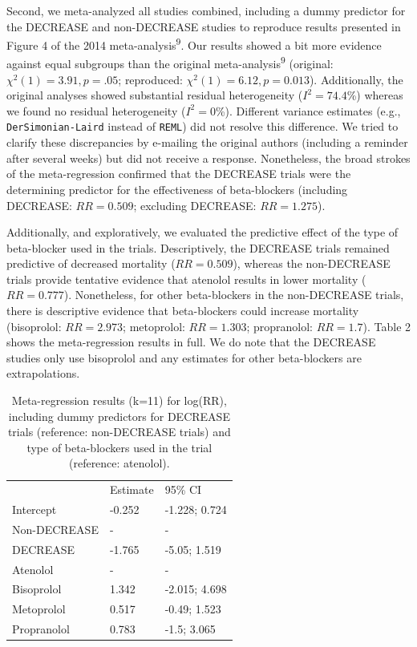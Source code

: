 \documentclass[]{article}
\begin{document}
Second, we meta-analyzed all studies combined, including a dummy
predictor for the DECREASE and non-DECREASE studies to reproduce results
presented in Figure 4 of the 2014 meta-analysis\textsuperscript{9}. Our
results showed a bit more evidence against equal subgroups than the
original meta-analysis\textsuperscript{9} (original:
\(\chi^2(1)=3.91,p=.05\); reproduced: \(\chi^2(1)=6.12,p=0.013\)).
Additionally, the original analyses showed substantial residual
heterogeneity (\(I^2=74.4\)\%) whereas we found no residual
heterogeneity (\(I^2=0\)\%). Different variance estimates (e.g.,
\texttt{DerSimonian-Laird} instead of \texttt{REML}) did not resolve
this difference. We tried to clarify these discrepancies by e-mailing
the original authors (including a reminder after several weeks) but did
not receive a response. Nonetheless, the broad strokes of the
meta-regression confirmed that the DECREASE trials were the determining
predictor for the effectiveness of beta-blockers (including DECREASE:
\(RR=0.509\); excluding DECREASE: \(RR=1.275\)).

Additionally, and exploratively, we evaluated the predictive effect of
the type of beta-blocker used in the trials. Descriptively, the DECREASE
trials remained predictive of decreased mortality (\(RR=0.509\)),
whereas the non-DECREASE trials provide tentative evidence that atenolol
results in lower mortality (\(RR=0.777\)). Nonetheless, for other
beta-blockers in the non-DECREASE trials, there is descriptive evidence
that beta-blockers could increase mortality (bisoprolol: \(RR=2.973\);
metoprolol: \(RR=1.303\); propranolol: \(RR=1.7\)). Table 2 shows the
meta-regression results in full. We do note that the DECREASE studies
only use bisoprolol and any estimates for other beta-blockers are
extrapolations.

\begin{longtable}[]{@{}lll@{}}
\caption{Meta-regression results (k=11) for log(RR), including dummy
predictors for DECREASE trials (reference: non-DECREASE trials) and type
of beta-blockers used in the trial (reference:
atenolol).}\tabularnewline
\toprule
\begin{minipage}[t]{0.32\columnwidth}\raggedright\strut
\strut
\end{minipage} & \begin{minipage}[t]{0.32\columnwidth}\raggedright\strut
Estimate\strut
\end{minipage} & \begin{minipage}[t]{0.32\columnwidth}\raggedright\strut
95\% CI\strut
\end{minipage}\tabularnewline
Intercept & -0.252 & -1.228; 0.724\tabularnewline
Non-DECREASE & - & -\tabularnewline
DECREASE & -1.765 & -5.05; 1.519\tabularnewline
Atenolol & - & -\tabularnewline
Bisoprolol & 1.342 & -2.015; 4.698\tabularnewline
Metoprolol & 0.517 & -0.49; 1.523\tabularnewline
Propranolol & 0.783 & -1.5; 3.065\tabularnewline
\bottomrule
\end{longtable}
\end{document}
